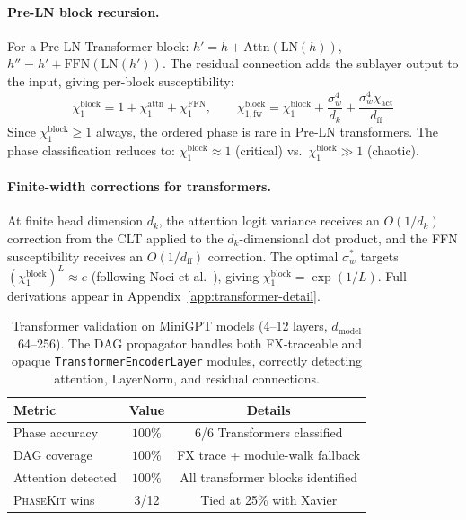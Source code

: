 \documentclass[10pt]{article}
\newcommand{\ToolName}{\textsc{PhaseKit}}
\begin{document}
\paragraph{Pre-LN block recursion.}
For a Pre-LN Transformer block: $h' = h + \text{Attn}(\text{LN}(h))$, $h'' = h' + \text{FFN}(\text{LN}(h'))$.
The residual connection adds the sublayer output to the input, giving per-block susceptibility:
\begin{equation}
    \chi_1^{\text{block}} = 1 + \chi_1^{\text{attn}} + \chi_1^{\text{FFN}}, \qquad
    \chi_{1,\text{fw}}^{\text{block}} = \chi_1^{\text{block}} + \frac{\sigma_w^4}{d_k} + \frac{\sigma_w^4 \chi_{\text{act}}}{d_{\text{ff}}}
    \label{eq:block-chi1}
\end{equation}
Since $\chi_1^{\text{block}} \geq 1$ always, the ordered phase is rare in Pre-LN transformers.
The phase classification reduces to: $\chi_1^{\text{block}} \approx 1$ (critical) vs.\ $\chi_1^{\text{block}} \gg 1$ (chaotic).

\paragraph{Finite-width corrections for transformers.}
At finite head dimension $d_k$, the attention logit variance receives an $O(1/d_k)$ correction from the CLT applied to the $d_k$-dimensional dot product, and the FFN susceptibility receives an $O(1/d_{\text{ff}})$ correction.
The optimal $\sigma_w^*$ targets $(\chi_1^{\text{block}})^L \approx e$ (following Noci et al.~\cite{noci2022signal}), giving $\chi_1^{\text{block}} = \exp(1/L)$.
Full derivations appear in Appendix~\ref{app:transformer-detail}.

\begin{table}[t]
\centering
\caption{Transformer validation on MiniGPT models (4--12 layers, $d_{\text{model}}$~64--256). The DAG propagator handles both FX-traceable and opaque \texttt{TransformerEncoderLayer} modules, correctly detecting attention, LayerNorm, and residual connections.}
\label{tab:transformer-results}
\small
\begin{tabular}{@{}lcc@{}}
\toprule
\textbf{Metric} & \textbf{Value} & \textbf{Details} \\
\midrule
Phase accuracy & $100\%$ & 6/6 Transformers classified \\
DAG coverage & $100\%$ & FX trace + module-walk fallback \\
Attention detected & $100\%$ & All transformer blocks identified \\
\ToolName{} wins & 3/12 & Tied at 25\% with Xavier \\
\bottomrule
\end{tabular}
\end{table}
\end{document}
